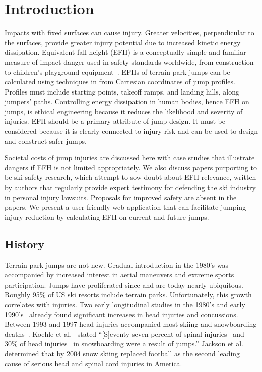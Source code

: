 \documentclass[smallextended]{svjour3}       %
\begin{document}
\section{Introduction}
\label{intro}
%
Impacts with fixed surfaces can cause injury. Greater velocities, perpendicular
to the surfaces, provide greater injury potential due to increased kinetic
energy dissipation. Equivalent fall height (EFH) is a conceptually simple and
familiar measure of impact danger used in safety standards worldwide, from
construction~\cite{OSHA2021} to children's playground
equipment~\cite{Chalmers1996}. EFHs of terrain park jumps can be calculated
using techniques in \cite{Levy2015} from Cartesian coordinates of jump
profiles. Profiles must include starting points, takeoff ramps, and landing
hills, along jumpers' paths. Controlling energy dissipation in human bodies,
hence EFH on jumps, is ethical engineering because it reduces the likelihood
and severity of injuries. EFH should be a primary attribute of jump design. It
must be considered because it is clearly connected to injury risk and can be
used to design and construct safer jumps.

Societal costs of jump injuries are discussed here with case studies that
illustrate dangers if EFH is not limited appropriately. We also discuss papers
purporting to be ski safety research, which attempt to sow doubt about EFH
relevance, written by authors that regularly provide expert testimony for
defending the ski industry in personal injury lawsuits. Proposals for improved
safety are absent in the papers. We present a user-friendly web application
that can facilitate jumping injury reduction by calculating EFH on current and
future jumps.

\subsection{History}
\label{sec:hist}
%
Terrain park jumps are not new. Gradual introduction in the 1980's was
accompanied by increased interest in aerial maneuvers and extreme sports
participation. Jumps have proliferated since and are today nearly ubiquitous.
Roughly 95\% of US ski resorts include terrain parks. Unfortunately, this
growth correlates with injuries. Two early longitudinal studies in the 1980's
and early 1990's~\cite{Deibert1998,Furrer1995} already found significant
increases in head injuries and concussions. Between 1993 and 1997 head injuries
accompanied most skiing and snowboarding deaths~\cite{CPSC1999}. Koehle et
al.~\cite{Koehle2002} stated ``[S]eventy-seven percent of spinal
injuries~\cite{Tarazi1999} and 30\% of head injuries~\cite{Fukuda2001} in
snowboarding were a result of jumps.'' Jackson et al.~\cite{Jackson2004}
determined that by 2004 snow skiing replaced football as the second leading
cause of serious head and spinal cord injuries in America.
\end{document}
